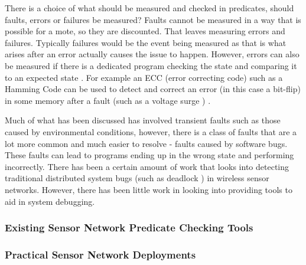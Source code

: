 There is a choice of what should be measured and checked in predicates, should faults, errors or failures be measured? Faults cannot be measured \cite{?} in a way that is possible for a mote, so they are discounted. That leaves measuring errors and failures. Typically failures would be the event being measured \cite{?} as that is what arises after an error actually causes the issue to happen. However, errors can also be measured if there is a dedicated program checking the state and comparing it to an expected state \cite{?}. For example an ECC (error correcting code) such as a Hamming Code can be used to detect and correct an error (in this case a bit-flip) in some memory after a fault (such as a voltage surge ) \cite{hamming1950error}.

Much of what has been discussed has involved transient faults such as those caused by environmental conditions, however, there is a class of faults that are a lot more common and much easier to resolve - faults caused by software bugs. These faults can lead to programs ending up in the wrong state and performing incorrectly. There has been a certain amount of work that looks into detecting traditional distributed system bugs (such as deadlock \cite{?}) in wireless sensor networks. However, there has been little work in looking into providing tools to aid in system debugging.


\subsubsection*{Existing Sensor Network Predicate Checking Tools}


\subsubsection*{Practical Sensor Network Deployments}



